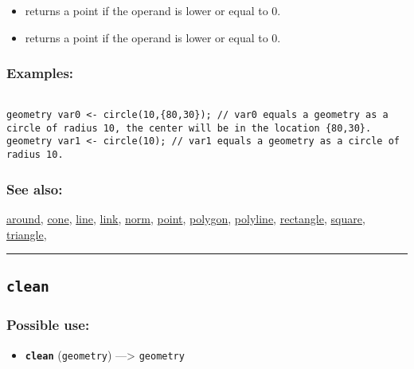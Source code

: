 \documentclass[]{book}
\providecommand{\tightlist}{%
  \setlength{\itemsep}{0pt}\setlength{\parskip}{0pt}}
\theoremstyle{definition}
\theoremstyle{definition}
\theoremstyle{definition}
\theoremstyle{remark}
\begin{document}
\begin{itemize}
\tightlist
\item
  returns a point if the operand is lower or equal to 0.\\
\item
  returns a point if the operand is lower or equal to 0.
\end{itemize}

\subsubsection{Examples:}\label{examples-64}

\begin{verbatim}
 
geometry var0 <- circle(10,{80,30}); // var0 equals a geometry as a circle of radius 10, the center will be in the location {80,30}. 
geometry var1 <- circle(10); // var1 equals a geometry as a circle of radius 10.
\end{verbatim}

\subsubsection{See also:}\label{see-also-52}

\href{OperatorsAA\#around}{around}, \href{OperatorsBC\#cone}{cone},
\href{OperatorsIM\#line}{line}, \href{OperatorsIM\#link}{link},
\href{OperatorsNR\#norm}{norm}, \href{OperatorsNR\#point}{point},
\href{OperatorsNR\#polygon}{polygon},
\href{OperatorsNR\#polyline}{polyline},
\href{OperatorsNR\#rectangle}{rectangle},
\href{OperatorsSZ\#square}{square},
\href{OperatorsSZ\#triangle}{triangle},

\begin{center}\rule{0.5\linewidth}{\linethickness}\end{center}

\subsection{\texorpdfstring{\texttt{clean}}{clean}}\label{clean}

\subsubsection{Possible use:}\label{possible-use-86}

\begin{itemize}
\tightlist
\item
  \textbf{\texttt{clean}} (\texttt{geometry}) ---\textgreater{}
  \texttt{geometry}
\end{itemize}
\end{document}
